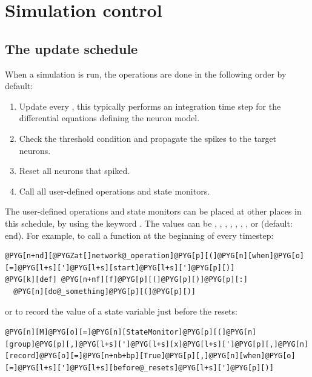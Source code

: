 \documentclass[letterpaper,10pt,english]{manual}
\begin{document}
\resetcurrentobjects
\hypertarget{--doc-simulation}{}

\hypertarget{index-118}{}\section{Simulation control}

\hypertarget{index-119}{}\subsection{The update schedule}

When a simulation is run, the operations are done in the following order by default:
\begin{enumerate}
\item {} 
Update every \hyperlink{brian.NeuronGroup}{}, this typically performs an integration time step for the differential equations defining the neuron model.

\item {} 
Check the threshold condition and propagate the spikes to the target neurons.

\item {} 
Reset all neurons that spiked.

\item {} 
Call all user-defined operations and state monitors.

\end{enumerate}

The user-defined operations and state monitors can be placed at other places in this schedule, by
using the keyword . The values can be , , ,
, , , ,  or
 (default: end). For example, to call a function  at the beginning of every timestep:

\begin{Verbatim}[commandchars=@\[\]]
@PYG[n+nd][@PYGZat[]network@_operation]@PYG[p][(]@PYG[n][when]@PYG[o][=]@PYG[l+s][']@PYG[l+s][start]@PYG[l+s][']@PYG[p][)]
@PYG[k][def] @PYG[n+nf][f]@PYG[p][(]@PYG[p][)]@PYG[p][:]
  @PYG[n][do@_something]@PYG[p][(]@PYG[p][)]
\end{Verbatim}

or to record the value of a state variable just before the resets:

\begin{Verbatim}[commandchars=@\[\]]
@PYG[n][M]@PYG[o][=]@PYG[n][StateMonitor]@PYG[p][(]@PYG[n][group]@PYG[p][,]@PYG[l+s][']@PYG[l+s][x]@PYG[l+s][']@PYG[p][,]@PYG[n][record]@PYG[o][=]@PYG[n+nb+bp][True]@PYG[p][,]@PYG[n][when]@PYG[o][=]@PYG[l+s][']@PYG[l+s][before@_resets]@PYG[l+s][']@PYG[p][)]
\end{Verbatim}
\end{document}
